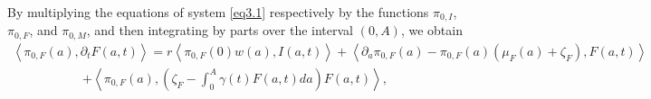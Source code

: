 \documentclass[10pt, a4paper]{amsart}
\makeatletter
\theoremstyle{plain}
\theoremstyle{definition}
\theoremstyle{remark}
\renewenvironment{proof}[1][\proofname]{\par
  \pushQED{\qed}%
  \normalfont \topsep6\p@\@plus6\p@\relax
  \trivlist
  \item[\hskip\labelsep
        \itshape
    #1\ \ref{#1}.]\ignorespaces
}{%
  \popQED\endtrivlist\@endpefalse
}
\numberwithin{equation}{section}
\makeatother
\begin{document}
\begin{proof}[of Lemma \ref{le3.4}]




By multiplying the equations of system \eqref{eq3.1} respectively by the functions $\pi_{0,I}$, $\pi_{0,F}$, and $\pi_{0,M}$, and then integrating by parts over the interval $(0, A)$, we obtain 
\begin{align}\label{e3.59}
     \left\langle \pi_{0,F}(a), \partial_ tF(a,t)\right\rangle= r\left\langle \pi_{0,F}(0)w(a),I(a,t)\right\rangle+\left\langle\partial_a\pi_{0,F}(a)-\pi_{0,F}(a)(\mu_F(a)+\zeta_F), F(a,t)\right\rangle
\end{align}
\begin{align*}
    +\left\langle\pi_{0,F}(a),(\zeta_F-\displaystyle\int_{0}^A \gamma(t)F(a,t)da)F(a,t)\right\rangle,
\end{align*}


\end{proof}
\end{document}
